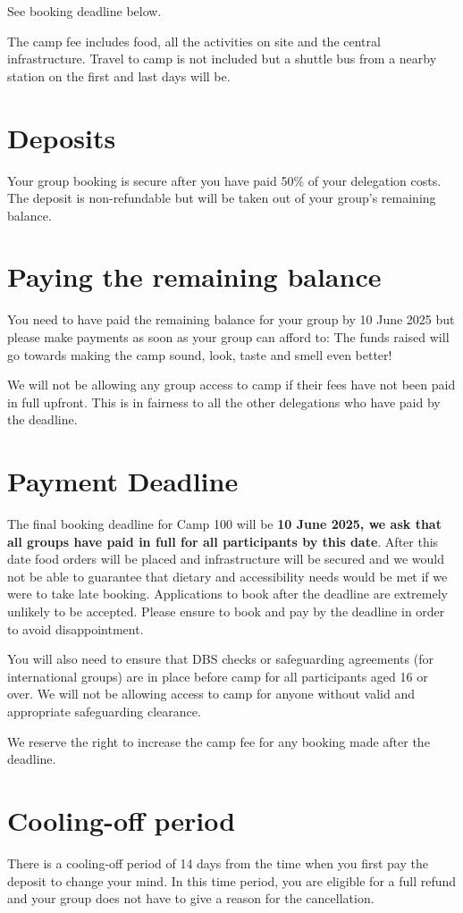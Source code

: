 \documentclass[a4paper, 11pt]{report}
\begin{document}
See booking deadline below.

The camp fee includes food, all the activities on site and the central infrastructure. Travel to camp is not included but a shuttle bus from a nearby station on the first and last days will be. 

\section{Deposits}
Your group booking is secure after you have paid 50\% of your delegation costs. The deposit is non-refundable but will be taken out of your group's remaining balance.

\section{Paying the remaining balance}
You need to have paid the remaining balance for your group by 10 June 2025 but please make payments as soon as your group can afford to: The funds raised will go towards making the camp sound, look, taste and smell even better! 

We will not be allowing any group access to camp if their fees have not been paid in full upfront. This is in fairness to all the other delegations who have paid by the deadline.

\section{Payment Deadline}
The final booking deadline for Camp 100 will be \textbf{10 June 2025, we ask that all groups have paid in full for all participants by this date}. After this date food orders will be placed and infrastructure will be secured and we would not be able to guarantee that dietary and accessibility needs would be met if we were to take late booking. Applications to book after the deadline are extremely unlikely to be accepted. Please ensure to book and pay by the deadline in order to avoid disappointment. 

You will also need to ensure that DBS checks or safeguarding agreements (for international groups) are in place before camp for all participants aged 16 or over. We will not be allowing access to camp for anyone without valid and appropriate safeguarding clearance. 

We reserve the right to increase the camp fee for any booking made after the deadline.

\section{Cooling-off period}
There is a cooling-off period of 14 days from the time when you first pay the deposit to change your mind. In this time period, you are eligible for a full refund and your group does not have to give a reason for the cancellation. 
\end{document}
